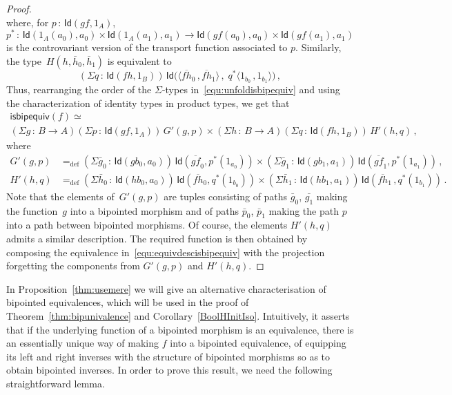 \documentclass[10pt,a4paper,oneside,reqno]{amsart}
\numberwithin{equation}{section}
\theoremstyle{mythm}
\theoremstyle{mydef}
\theoremstyle{myrmk}
\newcommand{\ie}{\text{i.e.\ }}
\newcommand{\defeq}{=_{\mathrm{def}}}
\newcommand{\co}{\,{:}\,}
\newcommand{\Id}{\mathsf{Id}}
\newcommand{\isbipequiv}{\mathsf{isbipequiv}}
\begin{document}
\begin{proof}
\[\]
where, for $p \co \Id(gf, 1_A)$, 
\[
p^* \co \Id( 1_A(a_0), a_0) \times \Id(1_A(a_1), a_1) \to \Id( gf(a_0), a_0) \times \Id( gf(a_1), a_1) 
\]
is the controvariant version of the transport function associated to $p$. Similarly, the type~$H(h, \bar{h}_0, \bar{h}_1)$ is equivalent to 
\[
(\Sigma q \co  \Id( f h, 1_B)) \, 
\Id 
\big(  
\langle 
\overline{fh}_0  \, ,    \overline{fh}_1 
\rangle \, ,  \; 
 q^*
 \langle 
 1_{b_0} \, , 1_{b_1}  
 \rangle  
 \big) \, ,
\]
Thus, rearranging the order of the $\Sigma$-types in~\eqref{equ:unfoldisbipequiv} and using the
characterization of identity types in product types, we get that 
\begin{multline}
\label{equ:equivdescisbipequiv}
\isbipequiv(f) \simeq  \\ (\Sigma g \co B \to A)(\Sigma p \co \Id(gf, 1_A))\,  G'(g,p) \times
(\Sigma h \co B \to A)(\Sigma q \co \Id(fh, 1_B))\, H'(h,q) \, , 
\end{multline}
where 
\begin{align} 
G'(g,p) & \defeq 
(\Sigma \bar{g}_0 \co \Id( g b_0, a_0)) \, \Id( \overline{gf}_0, p^*(1_{a_0}) ) \times 
(\Sigma  \bar{g}_1 \co \Id( g b_1, a_1)) \, \Id( \overline{gf}_1, p^*(1_{a_1}) ) \, ,
 \label{equ:bipgp} \\
 H'(h,q) & \defeq 
 (\Sigma \bar{h}_0 \co \Id ( h b_0,  a_0)) \, \Id ( \overline{fh}_0 , q^*(1_{b_0})) \times 
 (\Sigma \bar{h}_1 \co  \Id ( h b_1,  a_1)) \, \Id (   \overline{fh}_1 \, ,  q^*(1_{b_1})) \, .  \label{equ:biphq}
 \end{align} 
 Note that the elements of~$G'(g,p)$ are tuples consisting of paths $\bar{g}_0$, $\bar{g_1}$ making the function~$g$ into a bipointed morphism and of paths $\bar{p}_0$, $\bar{p}_1$ making the path $p$ into a path between
bipointed morphisms. Of course, the elements $H'(h,q)$ admits a similar description. 
The required  function  is then obtained 
by composing the equivalence in~\eqref{equ:equivdescisbipequiv} with the projection 
forgetting the components from $G'(g,p)$ and $H'(h,q)$. 
\end{proof} 


In Proposition~\ref{thm:usemere} we will give an alternative characterisation of bipointed 
equivalences, which will be used in the proof of Theorem~\ref{thm:bipunivalence} and Corollary~\ref{BoolHInitIso}.
Intuitively, it asserts that if the underlying function of a bipointed morphism is an equivalence, there is an 
essentially unique way of making $f$ into a bipointed equivalence, \ie of equipping its left and right inverses
with the structure of bipointed morphisms so as to obtain bipointed inverses. In order to prove this result,
we need the following straightforward lemma.
\end{document}
